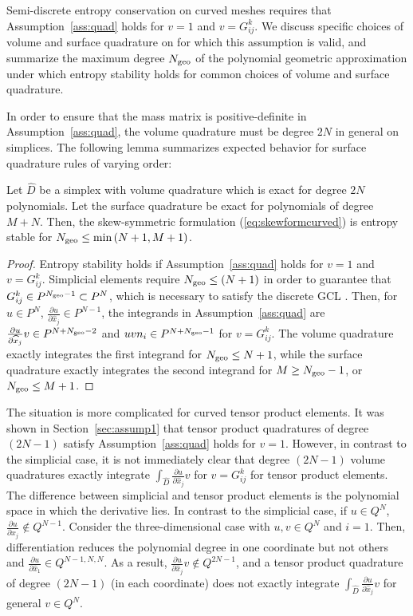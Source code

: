 \documentclass{svjour3}                     %
\renewcommand{\hat}{\widehat}
\newcommand{\pd}[2]{\frac{\partial#1}{\partial#2}}
\newcommand{\LRp}[1]{\left( #1 \right)}
\renewcommand{\note}[1]{{\color{blue}{#1}}}
\begin{document}
Semi-discrete entropy conservation on curved meshes requires that Assumption~\ref{ass:quad} holds for $v = 1$ and $v = G^k_{ij}$.  We discuss specific choices of volume and surface quadrature on for which this assumption is valid, and summarize the maximum degree $N_{\rm geo}$ of the polynomial geometric approximation under which entropy stability holds for common choices of volume and surface quadrature.  

In order to ensure that the mass matrix is positive-definite in Assumption~\ref{ass:quad}, the volume quadrature must be degree $2N$ in general on simplices.  The following lemma summarizes expected behavior for surface quadrature rules of varying order:
\begin{lemma}
Let $\hat{D}$ be a simplex with volume quadrature which is exact for degree $2N$ polynomials.  Let the surface quadrature be exact for polynomials of degree $M+N$.  Then, the skew-symmetric formulation (\ref{eq:skewformcurved}) is entropy stable for $N_{\rm geo} \leq \min\LRp{N+1,M+1}$.
\label{lemma:curvsimp}
\end{lemma}
\begin{proof}
Entropy stability holds if Assumption~\ref{ass:quad} holds for $v = 1$ and $v = G^k_{ij}$.  
Simplicial elements require $N_{\rm geo}\leq (N+1)$ in order to guarantee that $G^k_{ij}\in P^{N_{\rm geo}-1} \subset P^{N}$, which is necessary to satisfy the discrete GCL \cite{chan2018discretely}.  Then, for $u \in P^N$, $\pd{u}{\hat{x}_j}\in P^{N-1}$, the integrands in Assumption~\ref{ass:quad} are $\pd{u}{\hat{x}_j} v \in P^{N+N_{\rm geo}-2}$ and $uv n_i \in P^{N+N_{\rm geo}-1}$ for $v = G^k_{ij}$.  The volume quadrature exactly integrates the first integrand for $N_{\rm geo} \leq N+1$, while the surface quadrature exactly integrates the second integrand for $M \geq N_{\rm geo}-1$, or $N_{\rm geo} \leq M+1$.
\end{proof}

The situation is more complicated for curved tensor product elements.  It was shown in Section~\ref{sec:assump1} that tensor product quadratures of degree $(2N-1)$ satisfy Assumption~\ref{ass:quad} holds for $v = 1$.  However, in contrast to the simplicial case, it is not immediately clear that degree $(2N-1)$ volume quadratures exactly integrate $\int_{\hat{D}} \pd{u}{\hat{x}_j}v$ for $v = G^k_{ij}$ for tensor product elements.  The difference between simplicial and tensor product elements is the polynomial space in which the derivative lies.  In contrast to the simplicial case, if $u \in Q^N$, $\pd{u}{\hat{x}_j} \not\in Q^{N-1}$.  Consider the three-dimensional case with $u, v \in Q^N$ and $i = 1$.  Then, differentiation reduces the polynomial degree in one coordinate but not others and $\pd{u}{\hat{x}_1} \in Q^{N-1,N,N}$.  As a result, $\pd{u}{\hat{x}_j}v \not\in Q^{2N-1}$, and a tensor product quadrature of degree $(2N-1)$ (in each coordinate) does not exactly integrate $\int_{\hat{D}} \pd{u}{\hat{x}_j}v$ for general $v\in Q^N$.  
\end{document}
